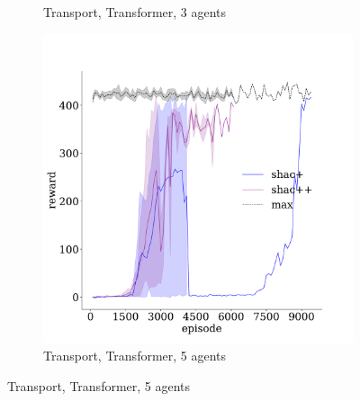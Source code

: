 \begin{figure}[!t]
\begin{subfigure}[b]{0.30\textwidth}
        \caption{Transport, Transformer, 3 agents}
        \label{fig:transport-ablation-transformer-3}
    \end{subfigure}
    \begin{subfigure}[b]{0.30\textwidth}
        \includegraphics[width=\textwidth]{figs/transport-ablation-5-transformer.pdf}
        \caption{Transport, Transformer, 5 agents}
        \label{fig:transport-ablation-transformer-5}
    \end{subfigure}


\end{figure}
